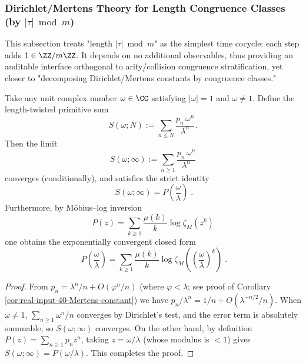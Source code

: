 \subsubsection{Dirichlet/Mertens Theory for Length Congruence Classes (by \texorpdfstring{$|\tau|\bmod m$}{|tau| mod m})}\label{app:real-input-40-length-mertens}
This subsection treats "length \(|\tau|\bmod m\)" as the simplest time cocycle: each step adds \(1\in\ZZ/m\ZZ\).
It depends on no additional observables, thus providing an auditable interface orthogonal to arity/collision congruence stratification, yet closer to "decomposing Dirichlet/Mertens constants by congruence classes."

\begin{proposition}\label{prop:real-input-40-length-twist-converge}
Take any unit complex number \(\omega\in\CC\) satisfying \(|\omega|=1\) and \(\omega\neq 1\). Define the length-twisted primitive sum
\[
S(\omega;N):=\sum_{n\le N}\frac{p_n\,\omega^n}{\lambda^n}.
\]
Then the limit
\[
S(\omega;\infty):=\sum_{n\ge 1}\frac{p_n\,\omega^n}{\lambda^n}
\]
converges (conditionally), and satisfies the strict identity
\[
\boxed{\;
S(\omega;\infty)=P\!\left(\frac{\omega}{\lambda}\right)\; }.
\]
Furthermore, by Möbius--log inversion
\[
P(z)=\sum_{k\ge 1}\frac{\mu(k)}{k}\log\zeta_M(z^k)
\]
one obtains the exponentially convergent closed form
\[
\boxed{\;
P\!\left(\frac{\omega}{\lambda}\right)
=\sum_{k\ge 1}\frac{\mu(k)}{k}\log \zeta_M\!\left(\left(\frac{\omega}{\lambda}\right)^k\right)\; }.
\]
\end{proposition}
\begin{proof}
From \(p_n=\lambda^n/n+O(\varphi^n/n)\) (where \(\varphi<\lambda\); see proof of Corollary \ref{cor:real-input-40-Mertens-constant}) we have
\(
p_n/\lambda^n=1/n+O(\lambda^{-n/2}/n)
\).
When \(\omega\neq 1\), \(\sum_{n\ge 1}\omega^n/n\) converges by Dirichlet's test, and the error term is absolutely summable, so \(S(\omega;\infty)\) converges.
On the other hand, by definition \(P(z)=\sum_{n\ge 1}p_n z^n\), taking \(z=\omega/\lambda\) (whose modulus is \(<1\)) gives \(S(\omega;\infty)=P(\omega/\lambda)\). This completes the proof.
\end{proof}

